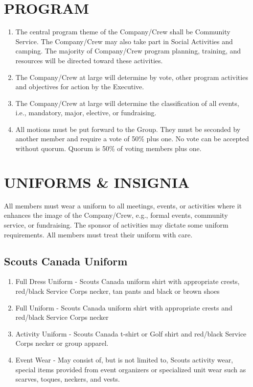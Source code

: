 \documentclass{Service_Corps_Document}
\begin{document}
    \section{PROGRAM}\label{sec:program}
    \begin{enumerate}
        \item The central program theme of the Company/Crew shall be Community Service.
        The Company/Crew may also take part in Social Activities and camping.
        The majority of Company/Crew program planning, training, and resources will be directed toward these activities.
        \item The Company/Crew at large will determine by vote, other program activities and objectives for action by the Executive.
        \item The Company/Crew at large will determine the classification of all events, i.e., mandatory, major, elective, or fundraising.
        \item All motions must be put forward to the Group.
        They must be seconded by another member and require a vote of 50\% plus one.
        No vote can be accepted without quorum.
        Quorum is 50\% of voting members plus one.
    \end{enumerate}


    \section{UNIFORMS \& INSIGNIA}\label{sec:uniforms-&-insignia}
    All members must wear a uniform to all meetings, events, or activities where it enhances the image of the Company/Crew, e.g., formal events, community service, or fundraising.
    The sponsor of activities may dictate some uniform requirements.
    All members must treat their uniform with care.

    \subsection{Scouts Canada Uniform}\label{subsec:scouts-canada-uniform}
    \begin{enumerate}
        \item Full Dress Uniform - Scouts Canada uniform shirt with appropriate crests, red/black Service Corps necker, tan pants and black or brown shoes
        \item Full Uniform - Scouts Canada uniform shirt with appropriate crests and red/black Service Corps necker
        \item Activity Uniform - Scouts Canada t-shirt or Golf shirt and red/black Service Corps necker or group apparel.
        \item Event Wear - May consist of, but is not limited to, Scouts activity wear, special items provided from event organizers or specialized unit wear such as scarves, toques, neckers, and vests.
    \end{enumerate}
\end{document}
